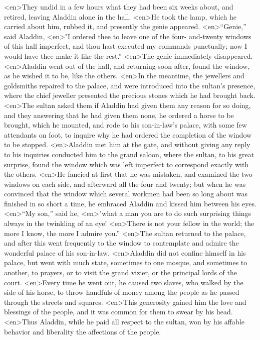 <en>They undid in a few hours what they had been six weeks about, and retired, leaving Aladdin alone in the hall.
<en>He took the lamp, which he carried about him, rubbed it, and presently the genie appeared.
<en>“Genie,” said Aladdin,
<en>"I ordered thee to leave one of the four- and-twenty windows of this hall imperfect, and thou hast executed my commands punctually; now I would have thee make it like the rest.”
<en>The genie immediately disappeared.
<en>Aladdin went out of the hall, and returning soon after, found the window, as he wished it to be, like the others.
<en>In the meantime, the jewellers and goldsmiths repaired to the palace, and were introduced into the sultan’s presence, where the chief jeweller presented the precious stones which he had brought back.
<en>The sultan asked them if Aladdin had given them any reason for so doing, and they answering that he had given them none, he ordered a horse to be brought, which he mounted, and rode to his son-in-law’s palace, with some few attendants on foot, to inquire why he had ordered the completion of the window to be stopped.
<en>Aladdin met him at the gate, and without giving any reply to his inquiries conducted him to the grand saloon, where the sultan, to his great surprise, found the window which was left imperfect to correspond exactly with the others.
<en>He fancied at first that he was mistaken, and examined the two windows on each side, and afterward all the four and twenty; but when he was convinced that the window which several workmen had been so long about was finished in so short a time, he embraced Aladdin and kissed him between his eyes.
<en>“My son,” said he,
<en>"what a man you are to do such surprising things always in the twinkling of an eye!
<en>There is not your fellow in the world; the more I know, the more I admire you.”
<en>The sultan returned to the palace, and after this went frequently to the window to contemplate and admire the wonderful palace of his son-in-law.
<en>Aladdin did not confine himself in his palace, but went with much state, sometimes to one mosque, and sometimes to another, to prayers, or to visit the grand vizier, or the principal lords of the court.
<en>Every time he went out, he caused two slaves, who walked by the side of his horse, to throw handfuls of money among the people as he passed through the streets and squares.
<en>This generosity gained him the love and blessings of the people, and it was common for them to swear by his head.
<en>Thus Aladdin, while he paid all respect to the sultan, won by his affable behavior and liberality the affections of the people.
